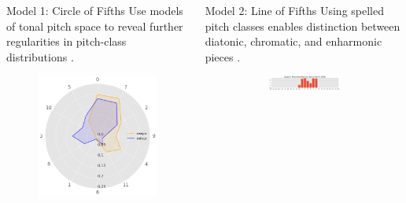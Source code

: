 \documentclass[final]{beamer}
\begin{document}
\begin{frame}[t]
\begin{minipage}[t][.6\textheight][t]{\textwidth}
\begin{columns}[t]
\begin{column}{0.3\textwidth}
      \begin{block}{Model 1: Circle of Fifths}
        Use \alert{models of tonal pitch space} to reveal further regularities in pitch-class distributions \autocite{Harasim2019}.
        \begin{figure}
          \centering
          \includegraphics[width=.9\textwidth]{img/radars}
        \end{figure}
      \end{block}

    \end{column}

    \begin{column}{0.3\textwidth}

      \begin{block}{Model 2: Line of Fifths}
        Using \alert{spelled pitch classes} enables distinction between diatonic, chromatic, and enharmonic pieces \autocite{Gardonyi2002}.
        \begin{figure}
				\centering

				\begin{subfigure}{\textwidth} %
					\includegraphics[width=\textwidth]{img/gmm_josquin.png}
				\end{subfigure}


\end{figure}
\end{block}
\end{column}
\end{columns}
\end{minipage}
\end{frame}
\end{document}
